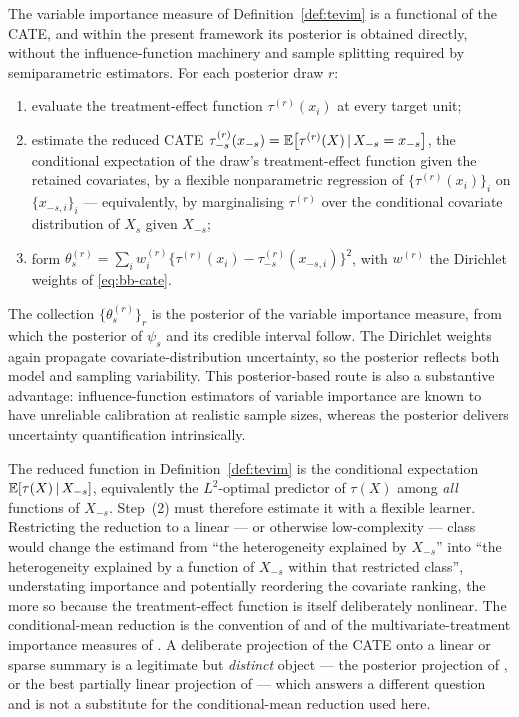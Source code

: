 The variable importance measure of Definition~\ref{def:tevim} is a functional of
the CATE, and within the present framework its posterior is obtained directly,
without the influence-function machinery and sample splitting required by
semiparametric estimators. For each posterior draw $r$:
\begin{enumerate}[label=\textup{(\arabic*)},leftmargin=2.4em]
\item evaluate the treatment-effect function $\tau^{(r)}(x_i)$ at every target
      unit;
\item estimate the reduced CATE $\tau^{(r)}_{-s}(x_{-s}) =
      \mathbb{E}\bigl[\tau^{(r)}(X) \,\vert\, X_{-s} = x_{-s}\bigr]$, the conditional
      expectation of the draw's treatment-effect function given the retained
      covariates, by a flexible nonparametric regression of
      $\{\tau^{(r)}(x_i)\}_i$ on $\{x_{-s,i}\}_i$ --- equivalently, by
      marginalising $\tau^{(r)}$ over the conditional covariate distribution of
      $X_s$ given $X_{-s}$;
\item form
      $\theta_s^{(r)} = \sum_i w_i^{(r)}
      \bigl\{\tau^{(r)}(x_i) - \tau^{(r)}_{-s}(x_{-s,i})\bigr\}^2$,
      with $w^{(r)}$ the Dirichlet weights of \eqref{eq:bb-cate}.
\end{enumerate}
The collection $\{\theta_s^{(r)}\}_r$ is the posterior of the variable
importance measure, from which the posterior of $\psi_s$ and its credible
interval follow. The Dirichlet weights again propagate covariate-distribution
uncertainty, so the posterior reflects both model and sampling variability. This
posterior-based route is also a substantive advantage: influence-function
estimators of variable importance are known to have unreliable calibration at
realistic sample sizes, whereas the posterior delivers uncertainty
quantification intrinsically.

\begin{remark}
\label{rem:cond-mean}
The reduced function in Definition~\ref{def:tevim} is the conditional
expectation $\mathbb{E}[\tau(X) \,\vert\, X_{-s}]$, equivalently the $L^2$-optimal
predictor of $\tau(X)$ among \emph{all} functions of $X_{-s}$. Step~(2) must
therefore estimate it with a flexible learner. Restricting the reduction to a
linear --- or otherwise low-complexity --- class would change the estimand from
``the heterogeneity explained by $X_{-s}$'' into ``the heterogeneity explained
by a function of $X_{-s}$ within that restricted class'', understating
importance and potentially reordering the covariate ranking, the more so because
the treatment-effect function is itself deliberately nonlinear. The
conditional-mean reduction is the convention of \citet{hines2022} and of the
multivariate-treatment importance measures of \citet{shin2024}. A deliberate
projection of the CATE onto a linear or sparse summary is a legitimate but
\emph{distinct} object --- the posterior projection of \citet{woody2020}, or the
best partially linear projection of \citet{ziersen2024} --- which answers a
different question and is not a substitute for the conditional-mean reduction
used here.
\end{remark}

